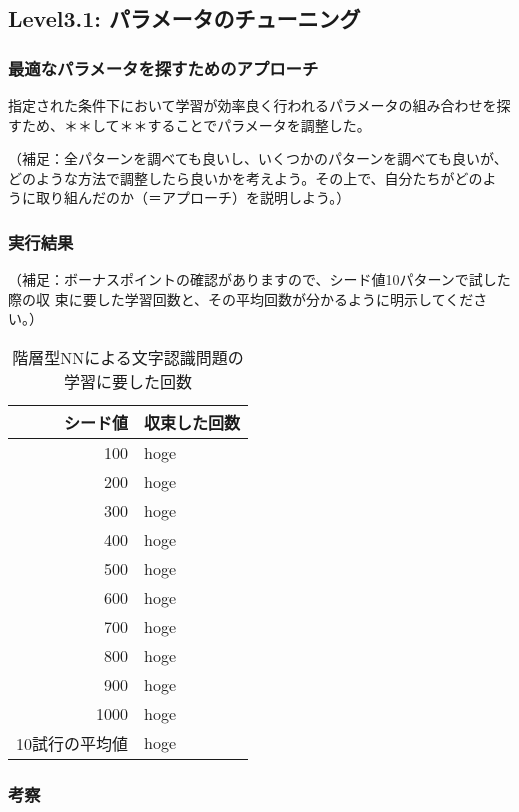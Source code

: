 \subsection{Level3.1: パラメータのチューニング}
\subsubsection{最適なパラメータを探すためのアプローチ}
指定された条件下において学習が効率良く行われるパラメータの組み合わせを探
すため、＊＊して＊＊することでパラメータを調整した。

（補足：全パターンを調べても良いし、いくつかのパターンを調べても良いが、
どのような方法で調整したら良いかを考えよう。その上で、自分たちがどのよ
うに取り組んだのか（＝アプローチ）を説明しよう。）

\subsubsection{実行結果}

（補足：ボーナスポイントの確認がありますので、シード値10パターンで試した際の収
束に要した学習回数と、その平均回数が分かるように明示してください。）
\begin{table}[htb]
 \begin{center}
  \caption{階層型NNによる文字認識問題の学習に要した回数}
  \label{table:level3}
  \begin{tabular}[htb]{r|l} \hline
   シード値 & 収束した回数 \\ \hline \hline
   100 & hoge \\ \hline
   200 & hoge \\ \hline
   300 & hoge \\ \hline
   400 & hoge \\ \hline
   500 & hoge \\ \hline
   600 & hoge \\ \hline
   700 & hoge \\ \hline
   800 & hoge \\ \hline
   900 & hoge \\ \hline
   1000 & hoge \\ \hline \hline
   10試行の平均値 & hoge \\ \hline
  \end{tabular}
 \end{center}
\end{table}



\subsubsection{考察}


